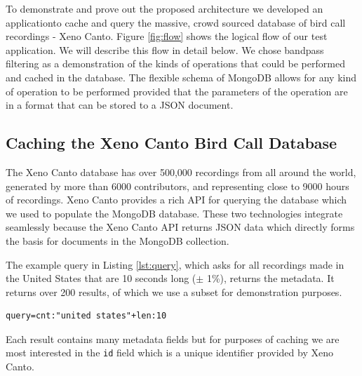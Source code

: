\documentclass[conference,twoside]{IEEEtran}
\newcommand{\code}[1]{\texttt{#1}}
\begin{document}
To demonstrate and prove out the proposed architecture we developed an application\footnotemark to cache and query the massive, crowd sourced database of bird call recordings - Xeno Canto. Figure \ref{fig:flow} shows the logical flow of our test application. We will describe this flow in detail below. We chose bandpass filtering as a demonstration of the kinds of operations that could be performed and cached in the database. The flexible schema of MongoDB allows for any kind of operation to be performed provided that the parameters of the operation are in a format that can be stored to a JSON document.



\subsection{Caching the Xeno Canto Bird Call Database}
The Xeno Canto database has over 500,000 recordings from all around the world, generated by more than 6000 contributors, and representing close to 9000 hours of recordings\cite{xenocanto}. Xeno Canto provides a rich API for querying the database which we used to populate the MongoDB database. These two technologies integrate seamlessly because the Xeno Canto API returns JSON data which directly forms the basis for documents in the MongoDB collection.

The example query in Listing \ref{lst:query}, which asks for all recordings made in the United States that are 10 seconds long ($\pm$ 1\%), returns the metadata. It returns over 200 results, of which we use a subset for demonstration purposes.
\begin{lstlisting}[language=Txt, caption={Xeno Canto Query}, label={lst:query}]
query=cnt:"united states"+len:10
\end{lstlisting}

Each result contains many metadata fields but for purposes of caching we are most interested in the \code{id} field which is a unique identifier provided by Xeno Canto.
\end{document}
